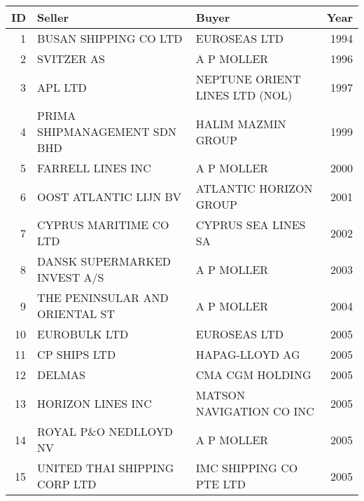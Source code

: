 
\begin{tabular}[t]{rllr}
\toprule
ID & Seller & Buyer & Year\\
\midrule
1 & BUSAN SHIPPING CO LTD & EUROSEAS LTD & 1994\\
2 & SVITZER AS & A P MOLLER & 1996\\
3 & APL LTD & NEPTUNE ORIENT LINES LTD (NOL) & 1997\\
4 & PRIMA SHIPMANAGEMENT SDN BHD & HALIM MAZMIN GROUP & 1999\\
5 & FARRELL LINES INC & A P MOLLER & 2000\\
6 & OOST ATLANTIC LIJN BV & ATLANTIC HORIZON GROUP & 2001\\
7 & CYPRUS MARITIME CO LTD & CYPRUS SEA LINES SA & 2002\\
8 & DANSK SUPERMARKED INVEST A/S & A P MOLLER & 2003\\
9 & THE PENINSULAR AND ORIENTAL ST & A P MOLLER & 2004\\
10 & EUROBULK LTD & EUROSEAS LTD & 2005\\
11 & CP SHIPS LTD & HAPAG-LLOYD AG & 2005\\
12 & DELMAS & CMA CGM HOLDING & 2005\\
13 & HORIZON LINES INC & MATSON NAVIGATION CO INC & 2005\\
14 & ROYAL P\&O NEDLLOYD NV & A P MOLLER & 2005\\
15 & UNITED THAI SHIPPING CORP LTD & IMC SHIPPING CO PTE LTD & 2005\\
\bottomrule
\end{tabular}
